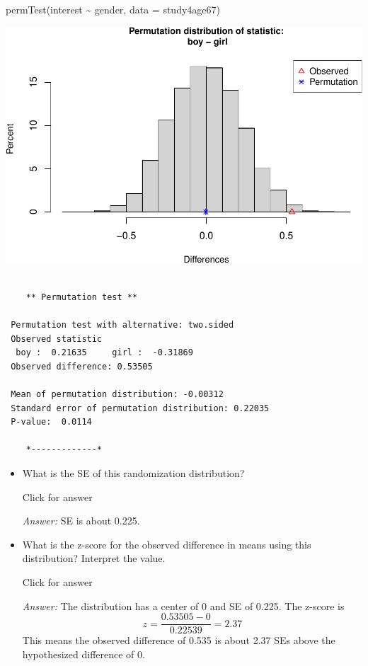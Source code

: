 \documentclass[
]{book}
\newenvironment{Shaded}{\begin{snugshade}}{\end{snugshade}}
\newcommand{\AttributeTok}[1]{\textcolor[rgb]{0.77,0.63,0.00}{#1}}
\newcommand{\FunctionTok}[1]{\textcolor[rgb]{0.00,0.00,0.00}{#1}}
\newcommand{\NormalTok}[1]{#1}
\newcommand{\SpecialCharTok}[1]{\textcolor[rgb]{0.00,0.00,0.00}{#1}}
\providecommand{\tightlist}{%
  \setlength{\itemsep}{0pt}\setlength{\parskip}{0pt}}
\begin{document}
\begin{Shaded}
\begin{Highlighting}[]
\FunctionTok{permTest}\NormalTok{(interest }\SpecialCharTok{\textasciitilde{}}\NormalTok{ gender, }\AttributeTok{data =}\NormalTok{ study4age67)}
\end{Highlighting}
\end{Shaded}

\includegraphics[width=1\linewidth]{Class_Activity_14_files/figure-latex/unnamed-chunk-7-2}

\begin{verbatim}

    ** Permutation test **

 Permutation test with alternative: two.sided 
 Observed statistic
  boy :  0.21635     girl :  -0.31869 
 Observed difference: 0.53505 

 Mean of permutation distribution: -0.00312 
 Standard error of permutation distribution: 0.22035 
 P-value:  0.0114 

    *-------------*
\end{verbatim}

\begin{itemize}
\tightlist
\item
  What is the SE of this randomization distribution?

  Click for answer

  \emph{Answer:} SE is about 0.225.
\end{itemize}

\vspace*{.5in}

\begin{itemize}
\tightlist
\item
  What is the z-score for the observed difference in means using this distribution? Interpret the value.
  \vspace*{.5in}

  Click for answer

  \emph{Answer:} The distribution has a center of 0 and SE of 0.225. The z-score is
  \[
  z = \dfrac{0.53505 - 0}{0.22539 } = 2.37
  \]
  This means the observed difference of 0.535 is about 2.37 SEs above the hypothesized difference of 0.
\end{itemize}
\end{document}
